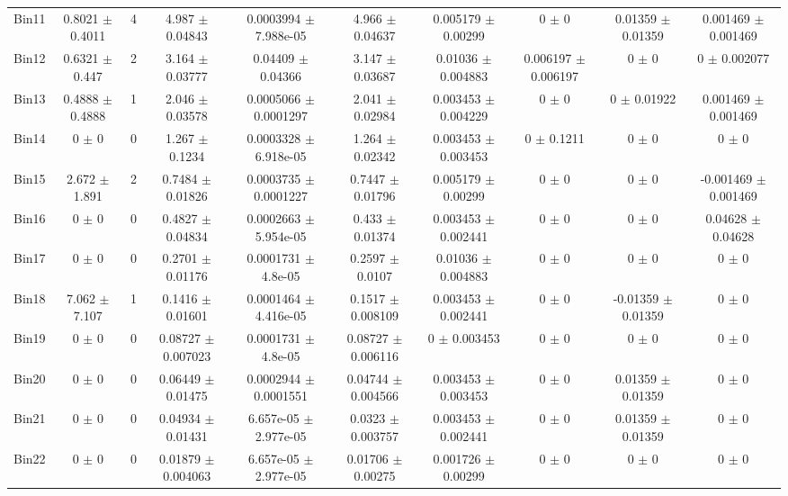 \begin{tabular}{@{\extracolsep{4pt}}lccccccccc@{}}
     Bin11 & 0.8021 $\pm$ 0.4011 & 4 & 4.987 $\pm$ 0.04843 & 0.0003994 $\pm$ 7.988e-05 & 4.966 $\pm$ 0.04637 & 0.005179 $\pm$ 0.00299 & 0 $\pm$ 0 & 0.01359 $\pm$ 0.01359 & 0.001469 $\pm$ 0.001469 \\ 
     Bin12 & 0.6321 $\pm$ 0.447 & 2 & 3.164 $\pm$ 0.03777 & 0.04409 $\pm$ 0.04366 & 3.147 $\pm$ 0.03687 & 0.01036 $\pm$ 0.004883 & 0.006197 $\pm$ 0.006197 & 0 $\pm$ 0 & 0 $\pm$ 0.002077 \\ 
     Bin13 & 0.4888 $\pm$ 0.4888 & 1 & 2.046 $\pm$ 0.03578 & 0.0005066 $\pm$ 0.0001297 & 2.041 $\pm$ 0.02984 & 0.003453 $\pm$ 0.004229 & 0 $\pm$ 0 & 0 $\pm$ 0.01922 & 0.001469 $\pm$ 0.001469 \\ 
     Bin14 & 0 $\pm$ 0 & 0 & 1.267 $\pm$ 0.1234 & 0.0003328 $\pm$ 6.918e-05 & 1.264 $\pm$ 0.02342 & 0.003453 $\pm$ 0.003453 & 0 $\pm$ 0.1211 & 0 $\pm$ 0 & 0 $\pm$ 0 \\ 
     Bin15 & 2.672 $\pm$ 1.891 & 2 & 0.7484 $\pm$ 0.01826 & 0.0003735 $\pm$ 0.0001227 & 0.7447 $\pm$ 0.01796 & 0.005179 $\pm$ 0.00299 & 0 $\pm$ 0 & 0 $\pm$ 0 & -0.001469 $\pm$ 0.001469 \\ 
     Bin16 & 0 $\pm$ 0 & 0 & 0.4827 $\pm$ 0.04834 & 0.0002663 $\pm$ 5.954e-05 & 0.433 $\pm$ 0.01374 & 0.003453 $\pm$ 0.002441 & 0 $\pm$ 0 & 0 $\pm$ 0 & 0.04628 $\pm$ 0.04628 \\ 
     Bin17 & 0 $\pm$ 0 & 0 & 0.2701 $\pm$ 0.01176 & 0.0001731 $\pm$ 4.8e-05 & 0.2597 $\pm$ 0.0107 & 0.01036 $\pm$ 0.004883 & 0 $\pm$ 0 & 0 $\pm$ 0 & 0 $\pm$ 0 \\ 
     Bin18 & 7.062 $\pm$ 7.107 & 1 & 0.1416 $\pm$ 0.01601 & 0.0001464 $\pm$ 4.416e-05 & 0.1517 $\pm$ 0.008109 & 0.003453 $\pm$ 0.002441 & 0 $\pm$ 0 & -0.01359 $\pm$ 0.01359 & 0 $\pm$ 0 \\ 
     Bin19 & 0 $\pm$ 0 & 0 & 0.08727 $\pm$ 0.007023 & 0.0001731 $\pm$ 4.8e-05 & 0.08727 $\pm$ 0.006116 & 0 $\pm$ 0.003453 & 0 $\pm$ 0 & 0 $\pm$ 0 & 0 $\pm$ 0 \\ 
     Bin20 & 0 $\pm$ 0 & 0 & 0.06449 $\pm$ 0.01475 & 0.0002944 $\pm$ 0.0001551 & 0.04744 $\pm$ 0.004566 & 0.003453 $\pm$ 0.003453 & 0 $\pm$ 0 & 0.01359 $\pm$ 0.01359 & 0 $\pm$ 0 \\ 
     Bin21 & 0 $\pm$ 0 & 0 & 0.04934 $\pm$ 0.01431 & 6.657e-05 $\pm$ 2.977e-05 & 0.0323 $\pm$ 0.003757 & 0.003453 $\pm$ 0.002441 & 0 $\pm$ 0 & 0.01359 $\pm$ 0.01359 & 0 $\pm$ 0 \\ 
     Bin22 & 0 $\pm$ 0 & 0 & 0.01879 $\pm$ 0.004063 & 6.657e-05 $\pm$ 2.977e-05 & 0.01706 $\pm$ 0.00275 & 0.001726 $\pm$ 0.00299 & 0 $\pm$ 0 & 0 $\pm$ 0 & 0 $\pm$ 0 \\ 

\end{tabular}
